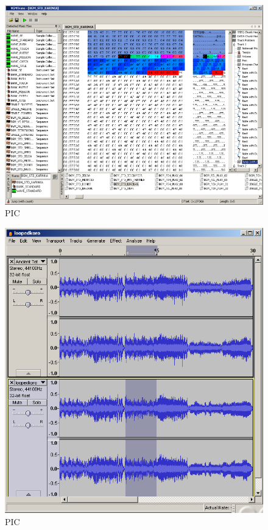 \documentclass[
]{book}
\begin{document}
\begin{figure}
\centering
\includegraphics{images/161_home_fast6191_romhackingguide_unrenamed_fil____original_borders_romhackguideSDATlooping_3.png}
\caption{PIC}
\end{figure}

\begin{figure}
\centering
\includegraphics{images/162_home_fast6191_romhackingguide_unrenamed_fil____original_borders_romhackguideSDATlooping_2.png}
\caption{PIC}
\end{figure}
\end{document}
